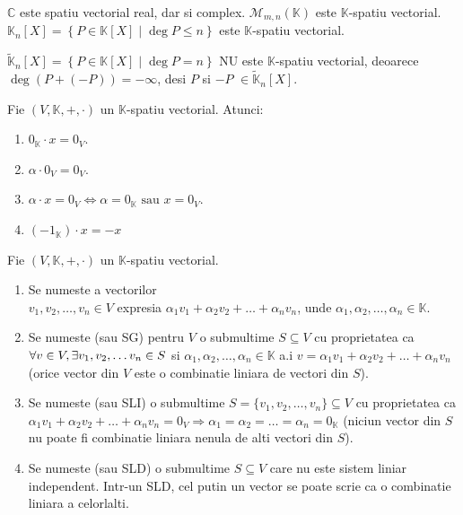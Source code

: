 \documentclass{article}
\begin{document}
\begin{enumerate}
  \exemplu $\mathbb{C}$ este spatiu vectorial real, dar si complex.
  \exemplu $\mathcal{M}_{m, n}(\mathbb{K})$ este $\mathbb{K}$-spatiu vectorial.
  \exemplu $\mathbb{K}_n [X] = \left\{ P \in \mathbb{K}[X] \middle\vert \deg P \leq n \right\}$ este $\mathbb{K}$-spatiu vectorial.
  
  \exemplu $\widetilde{\mathbb{K}}_n [X] = \left\{ P \in \mathbb{K}[X] \middle\vert \deg P = n \right\}$ NU este $\mathbb{K}$-spatiu vectorial, deoarece $\deg(P + (-P)) = -\infty$, desi $P$ si $-P$ $\in \widetilde{\mathbb{K}}_n[X]$.

  \begin{samepage}
    \proprietate Fie $(V, \mathbb{K}, +, \cdot)$ un $\mathbb{K}$-spatiu vectorial. Atunci:
    \begin{enumerate}
      \item $0_{\mathbb{K}} \cdot x = 0_V$.
      \item $\alpha \cdot 0_V = 0_V$.
      \item $\alpha \cdot x = 0_V \Leftrightarrow \alpha = 0_{\mathbb{K}} \text{ sau } x = 0_V$.
      \item $(-1_{\mathbb{K}}) \cdot x = -x$
    \end{enumerate}
  \end{samepage}


  \begin{tcolorbox}
   Fie $(V, \mathbb{K}, +, \cdot)$ un $\mathbb{K}$-spatiu vectorial. 
  \begin{enumerate}
    \item Se numeste  a vectorilor \\ $v_1, v_2, \dots, v_n \in V$ expresia $\alpha_1 v_1 + \alpha_2 v_2 + \dots + \alpha_n v_n$, unde $\alpha_1, \alpha_2, \dots, \alpha_n \in \mathbb{K}$.

  \item Se numeste  (sau SG) pentru $V$ o submultime $S \subseteq V$ cu proprietatea ca $\forall v \in V, \\ \exists v_1, v_2, \dots v_n \in S$ si $\alpha_1, \alpha_2, \dots, \alpha_n \in \mathbb{K}$ a.i $v = \alpha_1 v_1 + \alpha_2 v_2 + \dots + \alpha_n v_n$ (orice vector din $V$ este o combinatie liniara de vectori din $S$).

  \item Se numeste  (sau SLI) o submultime $S = \{v_1, v_2, \dots, v_n\} \subseteq V$ cu proprietatea ca $\alpha_1 v_1 + \alpha_2 v_2 + \dots + \alpha_n v_n = 0_V \Rightarrow \alpha_1 = \alpha_2 = \dots = \alpha_n = 0_{\mathbb{K}}$ (niciun vector din $S$ nu poate fi combinatie liniara nenula de alti vectori din $S$).
  \item Se numeste  (sau SLD) o submultime $S \subseteq V$ care nu este sistem liniar independent. Intr-un SLD, cel putin un vector se poate scrie ca o combinatie liniara a celorlalti.



\end{enumerate}
\end{tcolorbox}
\end{enumerate}
\end{document}
